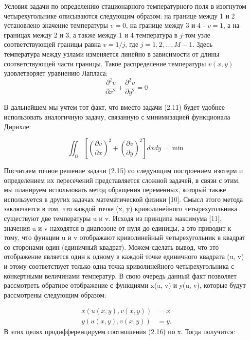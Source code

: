 \documentclass[a4paper,14pt,russian]{extreport}
\renewcommand{\_}{\kern-1.5pt\textunderscore\kern-1.5pt}
\begin{document}
Условия задачи по определению стационарного температурного поля в изогнутом четырехугольнике описываются следующим образом: на границе между 1 и 2 установлено значение температуры $v=0$, на границе между 3 и 4 - $v=1$, а на границах между 2 и 3, а также между 1 и 4 температура в $j$-том узле соответствующей границы равна $v=1/j$, где $j=1,2,\ldots,M-1$. Здесь температура между узлами изменяется линейно в зависимости от длины соответствующей части границы. Такое распределение температуры $v(x,y)$ удовлетворяет уравнению Лапласа:
\begin{equation}
\frac{\partial^2 v}{\partial x^2}+\frac{\partial^2 v}{\partial y^2}=0
\end{equation}

В дальнейшем мы учтем тот факт, что вместо задачи (2.11) будет удобнее использовать аналогичную задачу, связанную с минимизацией функционала Дирихле:

\begin{equation}
\iint_D\left[\left(\frac{\partial v}{\partial x}\right)^2+\left(\frac{\partial v}{\partial y}\right)^2\right] d x d y=\min
\end{equation}


Посчитаем точное решение задачи (2.15) со следующим построением изотерм и определением их пересечений представляется сложной задачей, в связи с этим, мы планируем использовать метод обращения переменных, который также используется в других задачах математической физики [10]. Смысл этого метода заключается в том, что каждой точке (x, y) криволинейного четырехугольника существуют две температуры u и v. Исходя из принципа максимума [11], значения u и v находятся в диапозоне от нуля до единицы, а это приводит к тому, что функции u и v отображают криволинейный четырехугольник в квадрат со сторонами один (единичный квадрат). Можем сделать вывод, что это отображение является один к одному в каждой точке единичного квадрата (u, v) и этому соответствует только одна точка криволинейного четырехугольника с конкертными величинами температур. В свою очередь данный факт позволяет рассмотреть обратное отображение с функциями x(u, v) и y(u, v), которые будут рассмотрены следующим образом:

\begin{equation}
\begin{aligned}
x(u(x, y), v(x, y)) &= x \\
y(u(x, y), v(x, y)) &= y.
\end{aligned}
\end{equation}
В этих целях продифференцируем соотношения (2.16) по x. Тогда получится:
\end{document}
